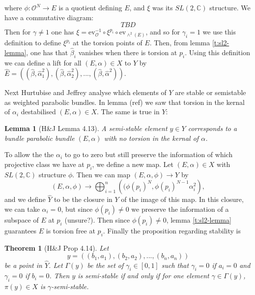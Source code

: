 \documentclass[]{article}
\newtheorem{lemma}{Lemma}
\newtheorem{theorem}{Theorem}
\newcommand{\C}{\mathbb{C}}
\newcommand{\OO}{\mathcal{O}}
\begin{document}
where $\phi:\OO^N \to E$ is a quotient defining $E$, and $\xi$ was its $SL(2,\C)$ structure. We have a commutative diagram:
\begin{equation}
	TBD
\end{equation}
Then for $\gamma \neq 1$ one has $\xi = \text{ev}_\OO^{-1}\circ \xi^{p_i} \circ \text{ev}_{\wedge^2(E)}$, and so for $\gamma_i=1$ we use this definition to define $\xi^{p_i}$ at the torsion points of $E$. Then, from lemma \ref{t:sl2-lemma}, one has that $\hat{\beta}_i$ vanishes when there is torsion at $p_i$. Using this definition we can define a lift for all $(E,\alpha)\in X$ to $Y$ by $
\hat{E} = \left(
(\hat{\beta}, \hat{\alpha}_1^2),(\hat{\beta},\hat{\alpha}_2^2),...,(\hat{\beta},\hat{\alpha}^2)
\right).$

Next Hurtubise and Jeffrey analyse which elements of $Y$ are stable or semistable as weighted parabolic bundles. In lemma (ref) we saw that torsion in the kernal of $\alpha_i$ destabilised $(E,\alpha) \in X$. The same is true in $Y$:
\begin{lemma}[H\&J Lemma 4.13]
	A semi-stable element $y\in Y$ corresponds to a bundle parabolic bundle $(E,\alpha)$ with no torsion in the kernal of $\alpha$.
\end{lemma}
To allow the the $\alpha_i$ to go to zero but still preserve the information of which projective class we have at $p_i$, we define a new map. Let $(E,\alpha)\in X$ with $SL(2,\C)$ structure $\phi$. Then we can map $(E,\alpha,\phi)\to Y$ by
\begin{equation}
	(E,\alpha,\phi) \to \bigoplus_{i=1}^n\left(
	(\phi(p_i)^N, \phi(p_i)^{N-1}\alpha_i^2
	\right),
\end{equation}
and we define $\hat{Y}$ to be the closure in $Y$ of the image of this map. In this closure, we can take $\alpha_i =0$, but since $\phi(p_i)\neq 0$ we preserve the information of a subspace of $E$ at $p_i$ (unsure?). Then since $\phi(p_i)\neq 0$, lemma \ref{t:sl2-lemma} guarantees $E$ is torsion free at $p_i$. Finally the proposition regarding stability is
\begin{theorem}[H\&J Prop 4.14]
	Let 
	\begin{equation}
		y = \left(
		(b_1, a_1), (b_2, a_2),...,(b_n, a_n)
		\right)
	\end{equation}
	be a point in $\hat{Y}$. Let $\Gamma(y)$ be the set of $\gamma_i \in [0,1]$ such that $\gamma_i =0$ if $a_i =0$ and $\gamma_i = 0$ if $b_i = 0$. Then $y$ is semi-stable if and only if for one element $\gamma \in \Gamma(y)$, $\pi(y)\in X$ is $\gamma$-semi-stable.
\end{theorem}
\end{document}
